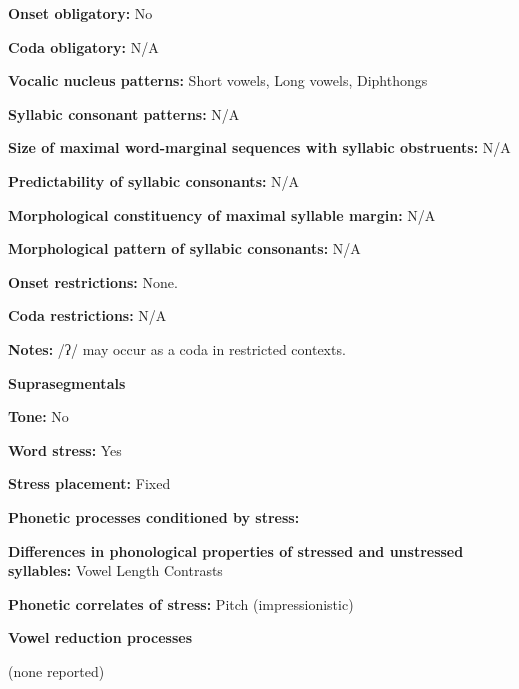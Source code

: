 \textbf{Onset obligatory:} No



\textbf{Coda obligatory:} N/A



\textbf{Vocalic nucleus patterns:} Short vowels, Long vowels, Diphthongs



\textbf{Syllabic consonant patterns:} N/A



\textbf{Size of maximal word{}-marginal sequences with syllabic obstruents:} N/A



\textbf{Predictability of syllabic consonants:} N/A



\textbf{Morphological constituency of maximal syllable margin:} N/A



\textbf{Morphological pattern of syllabic consonants:} N/A



\textbf{Onset restrictions:} None.



\textbf{Coda restrictions:} N/A



\textbf{Notes:} /ʔ/ may occur as a coda in restricted contexts.



\textbf{Suprasegmentals}



\textbf{Tone:} No



\textbf{Word stress:} Yes



\textbf{Stress placement:} Fixed



\textbf{Phonetic processes conditioned by stress:}



\textbf{Differences in phonological properties of stressed and unstressed syllables:} Vowel Length Contrasts



\textbf{Phonetic correlates of stress:} Pitch (impressionistic)



\textbf{Vowel reduction processes}



(none reported)



